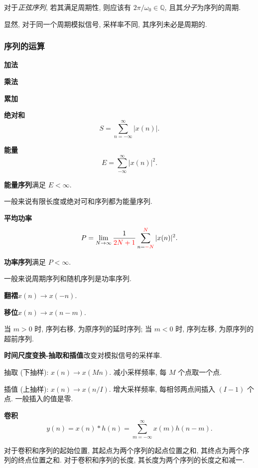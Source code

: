 对于\textit{正弦序列}, 若其满足周期性, 则应该有 $2\pi/\omega_0\in\mathbb{Q}$, 且其\textit{分子}为序列的周期.

显然, 对于同一个周期模拟信号, 采样率不同, 其序列未必是周期的.

\subsubsection{序列的运算}
\textbf{加法}

\textbf{乘法}

\textbf{累加}

\textbf{绝对和}
\begin{equation}
    S=\sum_{n=-\infty}^{\infty}|x(n)|.
\end{equation}

\textbf{能量}
\begin{equation}
    E=\sum_{-\infty}^{\infty}|x(n)|^2.
\end{equation}

\textbf{能量序列}\quad 满足 $E<\infty$.

一般来说有限长度或绝对可和序列都为能量序列.

\textbf{平均功率}
\begin{equation}
    P=\lim_{N\rightarrow\infty}\frac{1}{\color{red}{2N+1}}\sum_{n={\color{red}-N}}^{{\color{red}N}}|x(n)|^2.
\end{equation}

\textbf{功率序列}\quad 满足 $P<\infty$.

一般来说周期序列和随机序列是功率序列.

\textbf{翻褶}\quad $x(n)\rightarrow x(-n)$.

\textbf{移位}\quad $x(n)\rightarrow x(n-m)$.

当 $m>0$ 时, 序列右移, 为原序列的延时序列; 当 $m<0$ 时, 序列左移, 为原序列的超前序列.

\textbf{时间尺度变换-抽取和插值}\quad 改变对模拟信号的采样率.

抽取 (下抽样): $x(n)\rightarrow x(Mn)$. 减小采样频率, 每 $M$ 个点取一个点.

插值 (上抽样): $x(n)\rightarrow x(n/I)$. 增大采样频率, 每相邻两点间插入 $(I-1)$ 个点. 一般插入的值是零.

\textbf{卷积}
\begin{equation}
    y(n)=x(n)*h(n)=\sum_{m=-\infty}^{\infty}x(m)h(n-m).
\end{equation}

对于卷积和序列的起始位置, 其起点为两个序列的起点位置之和, 其终点为两个序列的终点位置之和. 对于卷积和序列的长度, 其长度为两个序列的长度之和减一.

